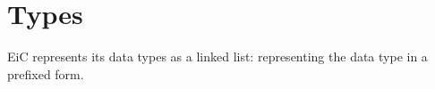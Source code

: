 \chapter{Types}

EiC represents its data types as a linked list: representing
the data type in a prefixed form.


